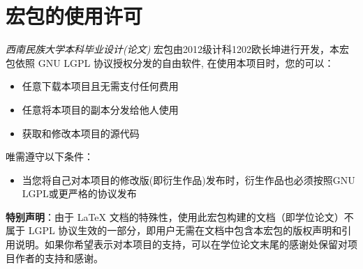 ﻿\appendix

  \chapter{宏包的使用许可}
  \label{appendix:a}

  \emph{西南民族大学本科毕业设计(论文)} 宏包由2012级计科1202欧长坤进行开发，本宏包依照 GNU LGPL 协议授权分发的自由软件, 在使用本项目时，您的可以：

\begin{itemize}
    \item 任意下载本项目且无需支付任何费用
    \item 任意将本项目的副本分发给他人使用
    \item 获取和修改本项目的源代码
\end{itemize}

  唯需遵守以下条件：

  \begin{itemize}
      \item 当您将自己对本项目的修改版(即衍生作品)发布时，衍生作品也必须按照GNU LGPL或更严格的协议发布
  \end{itemize}

  \textbf{特别声明}：由于 LaTeX 文档的特殊性，使用此宏包构建的文档（即学位论文）不属于 LGPL 协议生效的一部分，即用户无需在文档中包含本宏包的版权声明和引用说明。如果你希望表示对本项目的支持，可以在学位论文末尾的感谢处保留对项目作者的支持和感谢。

  \cleardoublepage
